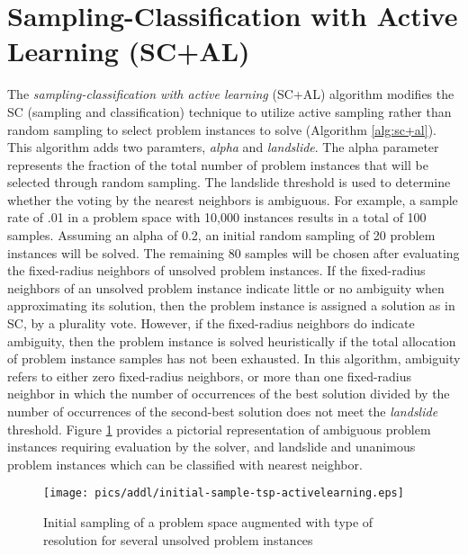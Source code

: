 \section{Sampling-Classification with Active Learning (SC+AL)}
The \textit {sampling-classification with active learning} (SC+AL) algorithm modifies the SC (sampling and classification) technique to utilize active sampling rather than random sampling to select problem instances to solve (Algorithm \ref{alg:sc+al}).  This algorithm adds two paramters, \textit{alpha} and \textit{landslide}.  The alpha parameter represents the fraction of the total number of problem instances that will be selected through random sampling.   The landslide threshold is used to determine whether the voting by the nearest neighbors is ambiguous.  For example, a sample rate of .01 in a problem space with 10,000 instances results in a total of 100 samples.  Assuming an alpha of 0.2, an initial random sampling of 20 problem instances will be solved.  The remaining 80 samples will be  chosen after evaluating the fixed-radius neighbors of unsolved problem instances. If the fixed-radius neighbors of an unsolved problem instance indicate little or no ambiguity when approximating its solution, then the problem instance is assigned a solution as in SC, by a plurality vote.  However, if the fixed-radius neighbors do indicate ambiguity, then the problem instance is solved heuristically if the total allocation of problem instance samples has not been exhausted.  In this algorithm, ambiguity refers to either zero fixed-radius neighbors, or more than one fixed-radius neighbor in which the number of occurrences of the best solution divided by the number of occurrences of the second-best solution does not meet the \textit{landslide} threshold.  Figure \ref{fig:initial-sample-tsp-activelearning-addl} provides a pictorial representation of ambiguous problem instances requiring evaluation by the solver, and landslide and unanimous problem instances which can be classified with nearest neighbor.

\begin{figure}
\begin{center}
    \texttt{[image: pics/addl/initial-sample-tsp-activelearning.eps]}
    \caption{Initial sampling of a problem space augmented with type of resolution for several unsolved problem instances}
    \label{fig:initial-sample-tsp-activelearning-addl}
\end{center}
\end{figure}

